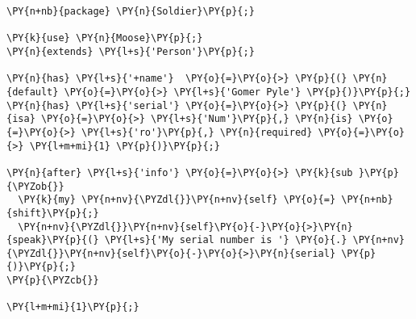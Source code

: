 \begin{Verbatim}[commandchars=\\\{\}]
\PY{n+nb}{package} \PY{n}{Soldier}\PY{p}{;}

\PY{k}{use} \PY{n}{Moose}\PY{p}{;}
\PY{n}{extends} \PY{l+s}{'Person'}\PY{p}{;}

\PY{n}{has} \PY{l+s}{'+name'}  \PY{o}{=}\PY{o}{>} \PY{p}{(} \PY{n}{default} \PY{o}{=}\PY{o}{>} \PY{l+s}{'Gomer Pyle'} \PY{p}{)}\PY{p}{;}
\PY{n}{has} \PY{l+s}{'serial'} \PY{o}{=}\PY{o}{>} \PY{p}{(} \PY{n}{isa} \PY{o}{=}\PY{o}{>} \PY{l+s}{'Num'}\PY{p}{,} \PY{n}{is} \PY{o}{=}\PY{o}{>} \PY{l+s}{'ro'}\PY{p}{,} \PY{n}{required} \PY{o}{=}\PY{o}{>} \PY{l+m+mi}{1} \PY{p}{)}\PY{p}{;}

\PY{n}{after} \PY{l+s}{'info'} \PY{o}{=}\PY{o}{>} \PY{k}{sub }\PY{p}{\PYZob{}}
  \PY{k}{my} \PY{n+nv}{\PYZdl{}}\PY{n+nv}{self} \PY{o}{=} \PY{n+nb}{shift}\PY{p}{;}
  \PY{n+nv}{\PYZdl{}}\PY{n+nv}{self}\PY{o}{-}\PY{o}{>}\PY{n}{speak}\PY{p}{(} \PY{l+s}{'My serial number is '} \PY{o}{.} \PY{n+nv}{\PYZdl{}}\PY{n+nv}{self}\PY{o}{-}\PY{o}{>}\PY{n}{serial} \PY{p}{)}\PY{p}{;}
\PY{p}{\PYZcb{}}

\PY{l+m+mi}{1}\PY{p}{;}
\end{Verbatim}

